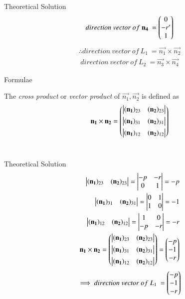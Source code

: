 \documentclass{beamer}
\begin{document}
\begin{frame}{Theoretical Solution}
\begin{align}
    direction\ vector\ of\ \mathbf{n_4}\ = \begin{pmatrix}0\\-r^{\prime}\\1\end{pmatrix}
\end{align}
\begin{align}
    \therefore direction\ vector\ of\ L_1\ = \vec{n_1} \times \vec{n_2} 
\end{align}
\begin{align}
    direction\ vector\ of\ L_2\ = \vec{n_3} \times \vec{n_4} 
\end{align}
\end{frame}

\begin{frame}{Formulae}

The {\em cross product} or {\em vector product} of $\vec{n_1}, \vec{n_2}$ is defined as
\begin{align}
  \label{eq:cross3d}
	\mathbf{n_1} \times \mathbf{n_2} 
	 = \begin{pmatrix} \begin{vmatrix}(\mathbf{n_1})_{23} & (\mathbf{n_2})_{23}\end{vmatrix} \\[1ex] \begin{vmatrix}(\mathbf{n_1})_{31} & (\mathbf{n_2})_{31}\end{vmatrix} \\[1ex] \begin{vmatrix}(\mathbf{n_1})_{12}  & (\mathbf{n_2})_{12}\end{vmatrix}\end{pmatrix}
\end{align}\\
\end{frame}
\begin{frame}{Theoretical Solution}
\begin{align}
	\begin{vmatrix}(\mathbf{n_1})_{23}&(\mathbf{n_2})_{23}\end{vmatrix}=\begin{vmatrix}-p & -r \\ 0 & 1\end{vmatrix}=-p\\\
	\begin{vmatrix}(\mathbf{n_1})_{31}&(\mathbf{n_2})_{31}\end{vmatrix}=\begin{vmatrix}0 & 1 \\ 1 & 0\end{vmatrix}=-1\\
	\begin{vmatrix}(\mathbf{n_1})_{12}&(\mathbf{n_2})_{12}\end{vmatrix}=\begin{vmatrix}1 & 0 \\ -p & -r\end{vmatrix}=-r
    	\\
	\mathbf{n_1}\times\mathbf{n_2}
	 =\begin{pmatrix} \begin{vmatrix}(\mathbf{n_1})_{23} & (\mathbf{n_2})_{23}\end{vmatrix} \\[1ex] \begin{vmatrix}(\mathbf{n_1})_{31} & (\mathbf{n_2})_{31}\end{vmatrix} \\[1ex] \begin{vmatrix}(\mathbf{n_1})_{12}  & (\mathbf{n_2})_{12}\end{vmatrix}\end{pmatrix}
=\begin{pmatrix}-p\\-1\\-r\end{pmatrix}
\end{align}
\begin{align}
    \implies direction\ vector\ of\ L_1\ = \begin{pmatrix}-p\\-1\\-r\end{pmatrix}
\end{align}
\end{frame}
\end{document}
